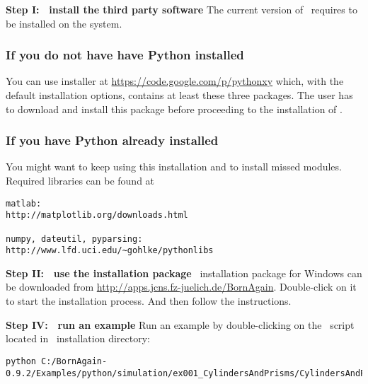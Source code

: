 \noindent
{\bf Step I: $~$ install the third party software} \newline
The current version of \BornAgain\ requires  
to be installed on the system. 

\subsubsection{If you do not have have Python installed}
You can use  installer
at \url{https://code.google.com/p/pythonxy} which, with the default installation options, contains at least these three packages.
The user has to download and install this package before proceeding to
the installation of \BornAgain.
\vspace*{2mm}


\subsubsection{If you have Python already installed}
You might want to keep using this installation and to install missed modules.
Required libraries can be found at
\begin{lstlisting}[language=shell, style=commandline]
matlab:
http://matplotlib.org/downloads.html

numpy, dateutil, pyparsing:
http://www.lfd.uci.edu/~gohlke/pythonlibs
\end{lstlisting}


\noindent
{\bf Step II: $~$ use the installation package } \newline
\BornAgain\ installation package for Windows can be downloaded from \url{http://apps.jcns.fz-juelich.de/BornAgain}.
Double-click on it to start the installation process. And then follow the instructions.
\vspace*{2mm}

\noindent
{\bf Step IV: $~$ run an example} \newline
Run an example by double-clicking on the \Python\ script located in \BornAgain\ installation directory:
\begin{lstlisting}[language=shell, style=commandline]
python C:/BornAgain-0.9.2/Examples/python/simulation/ex001_CylindersAndPrisms/CylindersAndPrisms.py
\end{lstlisting}





